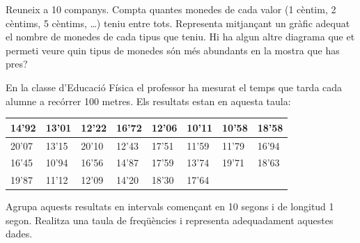 \begin{mylist}
 \exer  Reuneix a 10 companys. Compta quantes monedes de cada valor (1 cèntim, 2 cèntims, 5 cèntims, {\dots}) teniu entre tots. Representa mitjançant un gràfic adequat el nombre de monedes de cada tipus que teniu. Hi ha algun altre diagrama que et permeti veure quin tipus de monedes són més abundants en la mostra que has pres?

  
 \exer En la classe d'Educació Física el professor ha mesurat el temps que tarda cada alumne a recórrer 100 metres. Els resultats estan en aquesta taula:
\begin{center}
\begin{tabular}{|p{0.4in}|p{0.4in}|p{0.4in}|p{0.4in}|p{0.4in}|p{0.4in}|p{0.4in}|p{0.4in}|} \hline 
14'92 & 13'01 & 12'22 & 16'72 & 12'06 & 10'11 & 10'58 & 18'58 \\ \hline
20'07 & 13'15 & 20'10 & 12'43 & 17'51 & 11'59 & 11'79 & 16'94 \\ \hline
16'45 & 10'94 & 16'56 & 14'87 & 17'59 & 13'74 & 19'71 & 18'63 \\ \hline
19'87 & 11'12 & 12'09 & 14'20 & 18'30 & 17'64 & &\\ \hline 
\end{tabular}
\end{center}
Agrupa aquests resultats en intervals començant en 10 segons i de longitud 1 segon. Realitza una taula de freqüències i representa adequadament aquestes dades.


\end{mylist}


